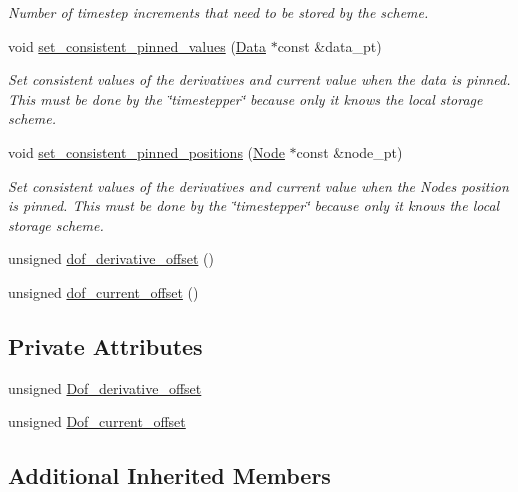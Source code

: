 \begin{DoxyCompactItemize}
\begin{DoxyCompactList}\small\item\em Number of timestep increments that need to be stored by the scheme. \end{DoxyCompactList}\item 
void \hyperlink{classoomph_1_1ContinuationStorageScheme_a279e4c16176c0374b9bba05519a17b0c}{set\+\_\+consistent\+\_\+pinned\+\_\+values} (\hyperlink{classoomph_1_1Data}{Data} $\ast$const \&data\+\_\+pt)
\begin{DoxyCompactList}\small\item\em Set consistent values of the derivatives and current value when the data is pinned. This must be done by the \char`\"{}timestepper\char`\"{} because only it knows the local storage scheme. \end{DoxyCompactList}\item 
void \hyperlink{classoomph_1_1ContinuationStorageScheme_ad08f35407fff9e171312d482cfdeacc0}{set\+\_\+consistent\+\_\+pinned\+\_\+positions} (\hyperlink{classoomph_1_1Node}{Node} $\ast$const \&node\+\_\+pt)
\begin{DoxyCompactList}\small\item\em Set consistent values of the derivatives and current value when the Nodes position is pinned. This must be done by the \char`\"{}timestepper\char`\"{} because only it knows the local storage scheme. \end{DoxyCompactList}\item 
unsigned \hyperlink{classoomph_1_1ContinuationStorageScheme_acef989300e17ce031538fe447f13c4d8}{dof\+\_\+derivative\+\_\+offset} ()
\item 
unsigned \hyperlink{classoomph_1_1ContinuationStorageScheme_a8f074b7e24750498f7d640e6476bef61}{dof\+\_\+current\+\_\+offset} ()
\end{DoxyCompactItemize}
\subsection*{Private Attributes}
\begin{DoxyCompactItemize}
\item 
unsigned \hyperlink{classoomph_1_1ContinuationStorageScheme_aafee8dedf6e4787bc3e65ba52eab26dc}{Dof\+\_\+derivative\+\_\+offset}
\item 
unsigned \hyperlink{classoomph_1_1ContinuationStorageScheme_a8b0d1e52fa6ff062f58b4d37ba5fbc7f}{Dof\+\_\+current\+\_\+offset}
\end{DoxyCompactItemize}
\subsection*{Additional Inherited Members}


